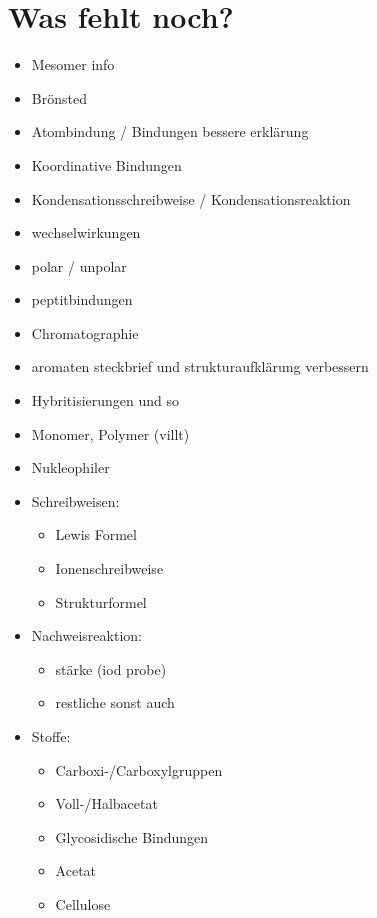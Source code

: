 
\chapter{Was fehlt noch?}
\begin{itemize}
    \item Mesomer info
    \item Brönsted
    \item Atombindung / Bindungen bessere erklärung
    \item Koordinative Bindungen
    \item Kondensationsschreibweise / Kondensationsreaktion
    \item wechselwirkungen
    \item polar / unpolar
    \item peptitbindungen
    \item Chromatographie
    \item aromaten steckbrief und strukturaufklärung verbessern
    \item Hybritisierungen und so
    \item Monomer, Polymer (villt)
    \item Nukleophiler
    
    \item Schreibweisen:
    \begin{itemize}
        \item Lewis Formel
        \item Ionenschreibweise
        \item Strukturformel
    \end{itemize}

    \item Nachweisreaktion:
    \begin{itemize}
        \item stärke (iod probe)
        \item restliche sonst auch
    \end{itemize}

    \item Stoffe:
    \begin{itemize}
        \item Carboxi-/Carboxylgruppen
        \item Voll-/Halbacetat
        \item Glycosidische Bindungen
        \item Acetat
        \item Cellulose
    \end{itemize}
\end{itemize}

